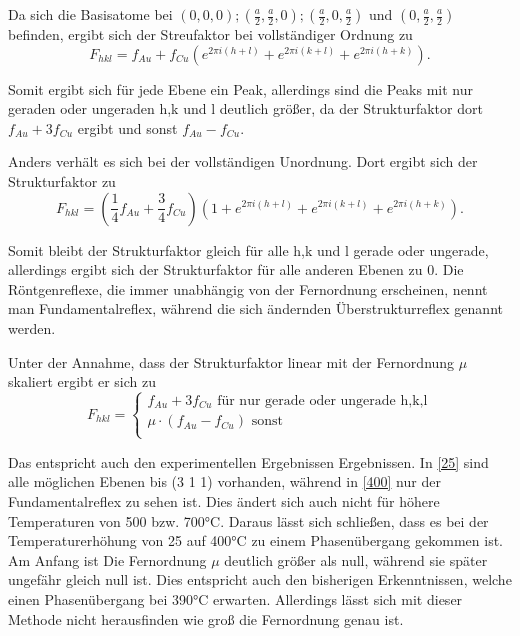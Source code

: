 \documentclass[
	a4paper,
	12pt,
	pagesize,
	ngerman
]{scrartcl}
\begin{document}
Da sich die Basisatome bei $(0,0,0) ; (\frac{a}{2},\frac{a}{2},0) ; (\frac{a}{2},0,\frac{a}{2})$ und $(0, \frac{a}{2}, \frac{a}{2})$ befinden, ergibt sich der Streufaktor bei vollständiger Ordnung zu 
\begin{equation}
F_{hkl} = f_{Au} + f_{Cu} (e^{2 \pi i(h+l)} + e^{2 \pi i(k+l)} + e^{2 \pi i(h+k)}).
\end{equation}

Somit ergibt sich für jede Ebene ein Peak, allerdings sind die Peaks mit nur geraden oder ungeraden h,k und l deutlich größer, da der Strukturfaktor dort $f_{Au} + 3f_{Cu}$ ergibt und sonst $f_{Au} - f_{Cu}$.

Anders verhält es sich bei der vollständigen Unordnung. Dort ergibt sich der Strukturfaktor zu 
\begin{equation}
F_{hkl} = (\frac{1}{4} f_{Au} + \frac{3}{4}f_{Cu}) (1 + e^{2 \pi i(h+l)} + e^{2 \pi i(k+l)} + e^{2 \pi i(h+k)}).
\end{equation}

Somit bleibt der Strukturfaktor gleich für alle h,k und l gerade oder ungerade, allerdings ergibt sich der Strukturfaktor für alle anderen Ebenen zu 0. 
Die Röntgenreflexe, die immer unabhängig von der Fernordnung erscheinen, nennt man Fundamentalreflex, während die sich ändernden Überstrukturreflex genannt werden.

Unter der Annahme, dass der Strukturfaktor linear mit der Fernordnung $\mu$ skaliert ergibt er sich zu
\begin{equation}
F_{hkl} = \left \{ \begin{array}{ll}
f_{Au} + 3f_{Cu} \text{  für nur gerade oder ungerade h,k,l} \\
\mu \cdot (f_{Au} - f_{Cu}) \text{  sonst} \\
\end{array} \right.
\end{equation}

Das entspricht auch den experimentellen Ergebnissen Ergebnissen. In \cref{25} sind alle möglichen Ebenen bis (3 1 1) vorhanden, während in \cref{400} nur der Fundamentalreflex zu sehen ist. Dies ändert sich auch nicht für höhere Temperaturen von 500 bzw. 700°C. 
Daraus lässt sich schließen, dass es bei der Temperaturerhöhung von 25 auf 400°C zu einem Phasenübergang gekommen ist. Am Anfang ist Die Fernordnung $\mu$ deutlich größer als null, während sie später ungefähr gleich null ist. Dies entspricht auch den bisherigen Erkenntnissen, welche einen Phasenübergang bei 390°C erwarten. Allerdings lässt sich mit dieser Methode nicht herausfinden wie groß die Fernordnung genau ist. 
\end{document}
